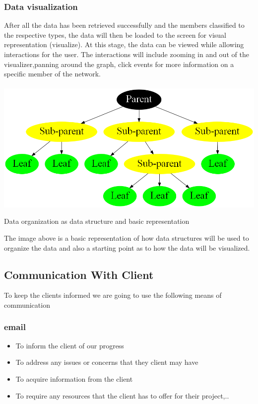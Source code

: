 \documentclass{scrartcl}
\begin{document}
\subsubsection{Data visualization}
After all the data has been retrieved successfully and the members classified to the respective types, the data will then be loaded to the screen for visual representation (visualize). At this stage, the data can be viewed while allowing interactions for the user. The interactions will include zooming in and out of the visualizer,panning around the graph, click events for more information on a specific member of the network.\\ \\
\includegraphics[width=\textwidth]{images/graph1.png}
\begin{center}
Data organization as data structure and basic representation
\end{center}
The image above is a basic representation of how data structures will be used to organize the data and also a starting point as to how the data will be visualized.
\subsection{Communication With Client}
To keep the clients informed we are going to use the following means of communication
\subsubsection{email}
\begin{itemize}
\item To inform the client of our progress
\item To address any issues or concerns that they client may have
\item To acquire information from the client
\item To require any resources that the client has to offer for their project,..
\end{itemize}
\end{document}
